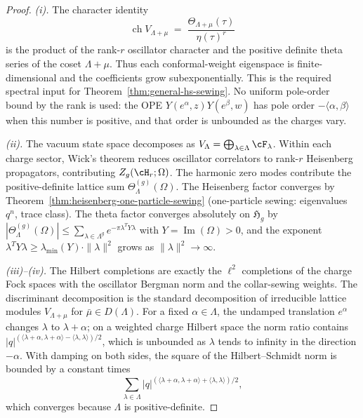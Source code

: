 \begin{proof}
\emph{(i).}
The character identity
\begin{equation}\label{eq:lattice-coset-character}
 \operatorname{ch} V_{\Lambda+\mu}
\;=\;
\frac{\Theta_{\Lambda+\mu}(\tau)}{\eta(\tau)^r}
\end{equation}
is the product of the rank-$r$ oscillator character and the positive
definite theta series of the coset $\Lambda+\mu$. Thus each
conformal-weight eigenspace is finite-dimensional and the coefficients
grow subexponentially. This is the required spectral input for
Theorem~\ref{thm:general-hs-sewing}. No uniform pole-order bound by
the rank is used: the OPE
$Y(e^\alpha,z)Y(e^\beta,w)$ has pole order
$-\langle\alpha,\beta\rangle$ when this number is positive, and that
order is unbounded as the charges vary.

\smallskip\noindent\emph{(ii).}
The vacuum state space decomposes as
$V_\Lambda=\bigoplus_{\lambda\in\Lambda}\cF_\lambda$.
Within each charge sector, Wick's theorem reduces oscillator
correlators to rank-$r$ Heisenberg propagators, contributing
$Z_g(\cH_r;\Omega)$. The harmonic zero modes contribute the
positive-definite lattice sum
$\Theta_\Lambda^{(g)}(\Omega)$.
The Heisenberg factor converges by
Theorem~\ref{thm:heisenberg-one-particle-sewing}
(one-particle sewing: eigenvalues~$q^n$, trace class).
The theta factor converges absolutely on $\mathfrak{H}_g$ by
$|\Theta_\Lambda^{(g)}(\Omega)| \leq
\sum_{\lambda\in\Lambda^g} e^{-\pi \lambda^T Y \lambda}$
with $Y = \operatorname{Im}(\Omega) > 0$, and the exponent
$\lambda^T Y \lambda \geq
\lambda_{\min}(Y) \cdot \|\lambda\|^2$
grows as $\|\lambda\|^2 \to \infty$.

\smallskip\noindent\emph{(iii)--(iv).}
The Hilbert completions are exactly the $\ell^2$ completions of the
charge Fock spaces with the oscillator Bergman norm and the
collar-sewing weights. The discriminant decomposition is the standard
decomposition of irreducible lattice modules
$V_{\Lambda+\mu}$ for $\bar\mu\in D(\Lambda)$.
For a fixed $\alpha\in\Lambda$, the undamped translation
$e^\alpha$ changes $\lambda$ to $\lambda+\alpha$; on a weighted
charge Hilbert space the norm ratio contains
$|q|^{(\langle\lambda+\alpha,\lambda+\alpha\rangle
-\langle\lambda,\lambda\rangle)/2}$, which is unbounded as
$\lambda$ tends to infinity in the direction $-\alpha$.
With damping on both sides, the square of the Hilbert--Schmidt norm is
bounded by a constant times
\[
 \sum_{\lambda\in\Lambda}
 |q|^{(\langle\lambda+\alpha,\lambda+\alpha\rangle
 +\langle\lambda,\lambda\rangle)/2},
\]
which converges because $\Lambda$ is positive-definite.


\end{proof}
